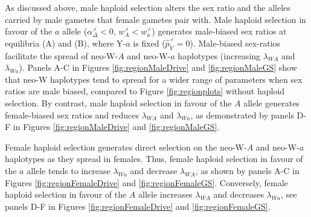 \documentclass[12pt]{article}
\begin{document}
As discussed above, male haploid selection alters the sex ratio and the alleles carried by male gametes that female gametes pair with. 
Male haploid selection in favour of the $a$ allele ($\alpha_{\Delta}^\male<0$, $w_{A}^\male<w_{a}^\male$) generates male-biased sex ratios at equilibria (A) and (B), where Y-$a$ is fixed ($\hat{p}_{Y}^\male=0$). 
Male-biased sex-ratios facilitate the spread of neo-W-$A$ and neo-W-$a$ haplotypes (increasing $\lambda_{WA}$ and $\lambda_{Wa}$). 
Panels A-C in Figures \ref{fig:regionMaleDrive} and \ref{fig:regionMaleGS} show that neo-W haplotypes tend to spread for a wider range of parameters when sex ratios are male biased, compared to Figure \ref{fig:regionplots} without haploid selection. 
By contrast, male haploid selection in favour of the $A$ allele generates female-biased sex ratios and reduces $\lambda_{WA}$ and $\lambda_{Wa}$, as demonstrated by panels D-F in Figures \ref{fig:regionMaleDrive} and \ref{fig:regionMaleGS}. 

Female haploid selection generates direct selection on the neo-W-$A$ and neo-W-$a$ haplotypes as they spread in females. 
Thus, female haploid selection in favour of the $a$ allele tends to increase $\lambda_{Wa}$ and decrease $\lambda_{WA}$, as shown by panels A-C in Figures \ref{fig:regionFemaleDrive} and \ref{fig:regionFemaleGS}. 
Conversely, female haploid selection in favour of the $A$ allele increases $\lambda_{WA}$ and decreases $\lambda_{Wa}$, see panels D-F in Figures \ref{fig:regionFemaleDrive} and \ref{fig:regionFemaleGS}. 

\end{document}
